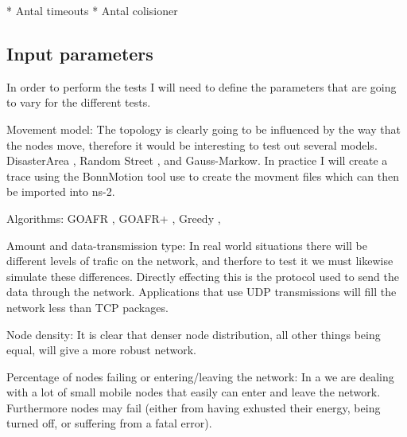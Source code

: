 * Antal timeouts
* Antal colisioner


\subsection{Input parameters}
In order to perform the tests I will need to define the parameters that are going to vary for the different tests.

Movement model: The topology is clearly going to be influenced by the way that the nodes move, therefore it would be interesting to test out several models. DisasterArea \cite{disasterArea},  Random Street \cite{randomStreet}, and Gauss-Markow. In practice I will create a trace using the BonnMotion  tool use to create the movment files which can then be imported into ns-2.

Algorithms: GOAFR \cite{gopher}, GOAFR+ \cite{gopher+}, Greedy \cite{gopher}, 

Amount and data-transmission type: In real world situations there will be different levels of trafic on the network, and therfore to test it we must likewise simulate these differences. Directly effecting this is the protocol used to send the data through the network. Applications that use UDP transmissions will fill the network less than TCP packages.

Node density: It is clear that denser node distribution, all other things being equal, will give a more robust network.

Percentage of nodes failing or entering/leaving the network: In a \manet we are dealing with a lot of small mobile nodes that easily can enter and leave the network. Furthermore nodes may fail (either from having exhusted their energy, being turned off, or suffering from a fatal error).


